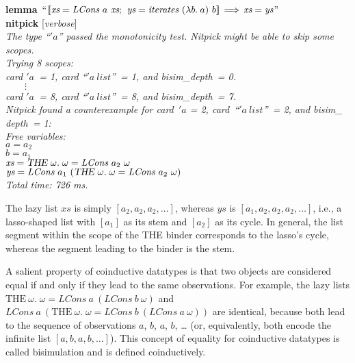 \documentclass[a4paper,12pt]{article}
\begin{document}
\prew
\textbf{lemma}~``$\mathopen{[\![}\textit{xs} = \textit{LCons}~a~\textit{xs};\>\,
\textit{ys} = \textit{iterates}~(\lambda b.\> a)~b\mathclose{]\!]} \,\Longrightarrow\, \textit{xs} = \textit{ys}$'' \\
\textbf{nitpick} [\textit{verbose}] \\[2\smallskipamount]
\slshape The type ``\kern1pt$'a$'' passed the monotonicity test. Nitpick might be able to skip
some scopes. \\[2\smallskipamount]
Trying 8 scopes: \\
\hbox{}\qquad \textit{card} $'a$~= 1, \textit{card} ``\kern1pt$'a~\textit{list}$''~= 1,
and \textit{bisim\_depth}~= 0. \\
\hbox{}\qquad $\qquad\vdots$ \\[.5\smallskipamount]
\hbox{}\qquad \textit{card} $'a$~= 8, \textit{card} ``\kern1pt$'a~\textit{list}$''~= 8,
and \textit{bisim\_depth}~= 7. \\[2\smallskipamount]
Nitpick found a counterexample for {\itshape card}~$'a$ = 2,
\textit{card}~``\kern1pt$'a~\textit{list}$''~= 2, and \textit{bisim\_\allowbreak
depth}~= 1:
\\[2\smallskipamount]
\hbox{}\qquad Free variables: \nopagebreak \\
\hbox{}\qquad\qquad $\textit{a} = a_2$ \\
\hbox{}\qquad\qquad $\textit{b} = a_1$ \\
\hbox{}\qquad\qquad $\textit{xs} = \textsl{THE}~\omega.\; \omega = \textit{LCons}~a_2~\omega$ \\
\hbox{}\qquad\qquad $\textit{ys} = \textit{LCons}~a_1~(\textsl{THE}~\omega.\; \omega = \textit{LCons}~a_2~\omega)$ \\[2\smallskipamount]
Total time: 726 ms.
\postw

The lazy list $\textit{xs}$ is simply $[a_2, a_2, a_2, \ldots]$, whereas
$\textit{ys}$ is $[a_1, a_2, a_2, a_2, \ldots]$, i.e., a lasso-shaped list with
$[a_1]$ as its stem and $[a_2]$ as its cycle. In general, the list segment
within the scope of the {THE} binder corresponds to the lasso's cycle, whereas
the segment leading to the binder is the stem.

A salient property of coinductive datatypes is that two objects are considered
equal if and only if they lead to the same observations. For example, the lazy
lists $\textrm{THE}~\omega.\; \omega =
\textit{LCons}~a~(\textit{LCons}~b~\omega)$ and
$\textit{LCons}~a~(\textrm{THE}~\omega.\; \omega =
\textit{LCons}~b~(\textit{LCons}~a~\omega))$ are identical, because both lead
to the sequence of observations $a$, $b$, $a$, $b$, \hbox{\ldots} (or,
equivalently, both encode the infinite list $[a, b, a, b, \ldots]$). This
concept of equality for coinductive datatypes is called bisimulation and is
defined coinductively.
\end{document}
